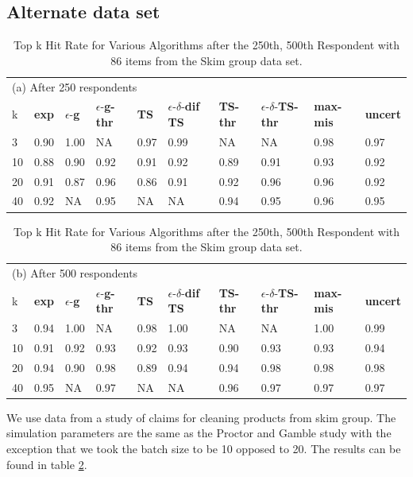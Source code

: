 \documentclass[nonblindrev]{informs3}
\newcommand{\fixedexpressS}{\textbf{exp}}
\newcommand{\egreedyS}{$\epsilon$-\textbf{g}}
\newcommand{\egreedythresS}{$\epsilon$-\textbf{g-thr}}
\newcommand{\misminS}{\textbf{max-mis}}
\newcommand{\tsS}{\textbf{TS} }
\newcommand{\edtsS}{$\epsilon$-$\delta$-\textbf{dif TS} }
\newcommand{\tsthresS}{\textbf{TS-thr} }
\newcommand{\edtsthresS}{$\epsilon$-$\delta$-\textbf{TS-thr} }
\newcommand{\uncertS}{\textbf{uncert} }
\begin{document}
\subsection{Alternate data set}
\begin{table}
\caption{Top k Hit Rate for Various Algorithms after the {250th, 500th} Respondent with 86 items from the Skim group data set.
 }
\label{table:skim}
\begin{center}
\begin{tabular}{llllllllll}
\hline 
\hline
\multicolumn{10}{l}{(a) After 250 respondents}\\
k &  \fixedexpressS&\egreedyS&\egreedythresS&\tsS&\edtsS&\tsthresS&\edtsthresS& \misminS& \uncertS \\ \hline
  3 & 0.90 &   1.00 &  NA &   0.97 & 0.99 & NA & NA &    0.98 &   0.97 \\
  10 &  0.88 &   0.90 & 0.92 &   0.91 & 0.92 & 0.89 & 0.91 &    0.93 &   0.92 \\
  20 & 0.91 & 0.87 &  0.96 & 0.86 & 0.91 & 0.92 & 0.96 &  0.96 &   0.92 \\  
  40 &  0.92 &   NA &  0.95 &  NA & NA & 0.94 & 0.95 &  0.96 &   0.95 \\
\hline
\hline
\end{tabular}
\begin{tabular}{llllllllll}
\multicolumn{10}{l}{(b) After 500 respondents}\\
k &  \fixedexpressS&\egreedyS&\egreedythresS&\tsS&\edtsS&\tsthresS&\edtsthresS& \misminS& \uncertS  \\
\hline
   3 & 0.94 & 1.00 & NA & 0.98 & 1.00 & NA & NA & 1.00 &   0.99 \\
  10 &  0.91 &   0.92 &  0.93 &   0.92 & 0.93 & 0.90 & 0.93 &    0.93 &   0.94 \\  
  20 &  0.94 &   0.90 & 0.98 &  0.89 & 0.94 & 0.94 & 0.98 &  0.98 &   0.98 \\ 
  40 &  0.95 &   NA & 0.97 & NA & NA & 0.96 &  0.97 & 0.97 & 0.97 \\
\hline 
\hline
\end{tabular}
\end{center}
\end{table}
We use data from a study of claims for cleaning products from skim group. The simulation parameters are the same as the Proctor and Gamble study with the exception that we took the batch size to be 10 opposed to 20. The results can be found in table \ref{table:skim}.
\end{document}
